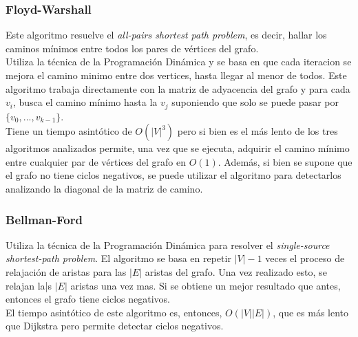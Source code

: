 \documentclass{article}
\newcommand\tab[1][0.5cm]{\hspace*{#1}}
\begin{document}
            \subsubsection{Floyd-Warshall}
            \tab Este algoritmo resuelve el \emph{all-pairs shortest path problem}, es decir, hallar los
            caminos mínimos entre todos los pares de vértices del grafo. \\
            \tab Utiliza la técnica de la Programación Dinámica y se basa en que cada iteracion se mejora
            el camino minimo entre dos vertices, hasta llegar al menor de todos. Este algoritmo trabaja
            directamente con la matriz de adyacencia del grafo y para cada $v_{i}$, busca el camino
            mínimo hasta la $v_{j}$ suponiendo que solo se puede pasar por $\{ v_{0}, ..., v_{k-1}\}$.\\
            \tab Tiene un tiempo asintótico de $O(|V|^3)$ pero si bien es el más lento de los tres
            algoritmos analizados permite, una vez que se ejecuta, adquirir el camino mínimo entre cualquier
            par de vértices del grafo en $O(1)$. Además, si bien se supone que el grafo no tiene ciclos negativos,
            se puede utilizar el algoritmo para detectarlos analizando la diagonal de la matriz de camino.

            \subsubsection{Bellman-Ford}
            \tab Utiliza la técnica de la Programación Dinámica para resolver el \emph{single-source shortest-path problem}.
            \tab El algoritmo se basa en repetir $|V| - 1$ veces el proceso de relajación de aristas para
            las $|E|$ aristas del grafo. Una vez realizado esto, se relajan la|s $|E|$ aristas una vez mas.
            Si se obtiene un mejor resultado que antes, entonces el grafo tiene ciclos negativos. \\
            \tab El tiempo asintótico de este algoritmo es, entonces, $O(|V||E|)$, que es más lento que Dijkstra
            pero permite detectar ciclos negativos.
\end{document}
